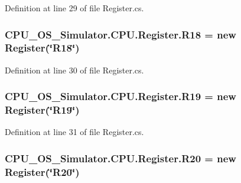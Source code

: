 Definition at line 29 of file Register.\+cs.

\hypertarget{class_c_p_u___o_s___simulator_1_1_c_p_u_1_1_register_aac05b1dce0cbfda874ca7c1783485095}{}
\subsubsection[{R18}]{ C\+P\+U\+\_\+\+O\+S\+\_\+\+Simulator.\+C\+P\+U.\+Register.\+R18 = new {\bf Register}(\char`\"{}R18\char`\"{})\hspace{0.3cm}{\ttfamily [static]}}\label{class_c_p_u___o_s___simulator_1_1_c_p_u_1_1_register_aac05b1dce0cbfda874ca7c1783485095}


Definition at line 30 of file Register.\+cs.

\hypertarget{class_c_p_u___o_s___simulator_1_1_c_p_u_1_1_register_a1d5394eb0e63d28e96decccbdbc2ec2c}{}
\subsubsection[{R19}]{ C\+P\+U\+\_\+\+O\+S\+\_\+\+Simulator.\+C\+P\+U.\+Register.\+R19 = new {\bf Register}(\char`\"{}R19\char`\"{})\hspace{0.3cm}{\ttfamily [static]}}\label{class_c_p_u___o_s___simulator_1_1_c_p_u_1_1_register_a1d5394eb0e63d28e96decccbdbc2ec2c}


Definition at line 31 of file Register.\+cs.

\hypertarget{class_c_p_u___o_s___simulator_1_1_c_p_u_1_1_register_a6fe52ef881281bbfdc42aa7f4cc68f4d}{}
\subsubsection[{R20}]{ C\+P\+U\+\_\+\+O\+S\+\_\+\+Simulator.\+C\+P\+U.\+Register.\+R20 = new {\bf Register}(\char`\"{}R20\char`\"{})\hspace{0.3cm}{\ttfamily [static]}}\label{class_c_p_u___o_s___simulator_1_1_c_p_u_1_1_register_a6fe52ef881281bbfdc42aa7f4cc68f4d}


